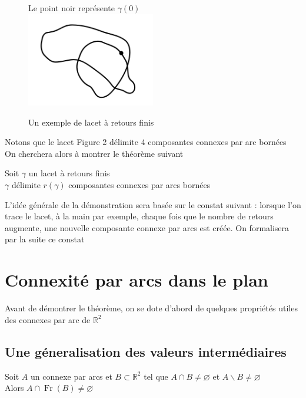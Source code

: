 \documentclass{article}
\begin{document}
\begin{flushleft}
\begin{figure}[h]
    \caption{Un exemple de lacet à retours finis}
    \centering
    Le point noir représente $\gamma(0)$\\
    \includegraphics*[width=0.5\textwidth]{Lacet retours finis.png}
\end{figure}

Notons que le lacet Figure 2 délimite 4 composantes connexes par arc bornées\\
On cherchera alors à montrer le théorème suivant
\begin{tcolorbox}[colback = purple!20!white, colframe = purple!60!white, title = Théorème des retours]
    Soit $\gamma$ un lacet à retours finis\\
    $\gamma$ délimite $r(\gamma)$ composantes connexes par arcs bornées
\end{tcolorbox}

L'idée générale de la démonstration sera basée sur le constat suivant : lorsque l'on trace le lacet, à la main par exemple, chaque fois
que le nombre de retours augmente, une nouvelle composante connexe par arcs est créée. On formalisera par la suite ce constat

\section{Connexité par arcs dans le plan}

Avant de démontrer le théorème, on se dote d'abord de quelques propriétés utiles des connexes par arc de $\mathbb{R}^2$

\subsection{Une géneralisation des valeurs intermédiaires}

\begin{tcolorbox}[colback = purple!20!white, colframe = purple!60!white, title = Proposition 1]
    Soit $A$ un connexe par arcs et $B \subset \mathbb{R}^2$ tel que $A \cap B \neq \varnothing$
    et $A \backslash B \neq \varnothing$\\
    Alors $A \cap \operatorname{Fr}(B) \neq \varnothing$
\end{tcolorbox}


\end{flushleft}
\end{document}
